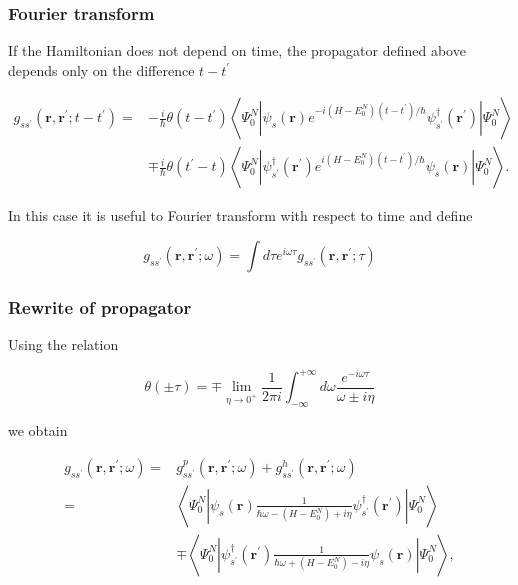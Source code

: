 \documentclass[compress]{beamer}
\begin{document}
\frame
{
\frametitle{Fourier transform}
\begin{small}
{\scriptsize

If the Hamiltonian does not depend on time, the propagator defined above
depends only on the difference $t-t^{\prime}$

$$
\begin{aligned}
g_{s s^{\prime}}\left(\mathbf{r}, \mathbf{r}^{\prime} ; t-t^{\prime}\right)= & -\frac{i}{\hbar} \theta\left(t-t^{\prime}\right)\left\langle\Psi_{0}^{N}\left|\psi_{s}(\mathbf{r}) e^{-i\left(H-E_{0}^{N}\right)\left(t-t^{\prime}\right) / \hbar} \psi_{s^{\prime}}^{\dagger}\left(\mathbf{r}^{\prime}\right)\right| \Psi_{0}^{N}\right\rangle \\
& \mp \frac{i}{\hbar} \theta\left(t^{\prime}-t\right)\left\langle\Psi_{0}^{N}\left|\psi_{s^{\prime}}^{\dagger}\left(\mathbf{r}^{\prime}\right) e^{i\left(H-E_{0}^{N}\right)\left(t-t^{\prime}\right) / \hbar} \psi_{s}(\mathbf{r})\right| \Psi_{0}^{N}\right\rangle .
\end{aligned}
$$

In this case it is useful to Fourier transform with respect to time and define

$$
g_{s s^{\prime}}\left(\mathbf{r}, \mathbf{r}^{\prime} ; \omega\right)=\int d \tau e^{i \omega \tau} g_{s s^{\prime}}\left(\mathbf{r}, \mathbf{r}^{\prime} ; \tau\right)
$$

}
\end{small}
}


\frame
{
\frametitle{Rewrite of propagator}
\begin{small}
{\scriptsize

Using the relation

$$
\theta( \pm \tau)=\mp \lim _{\eta \rightarrow 0^{+}} \frac{1}{2 \pi i} \int_{-\infty}^{+\infty} d \omega \frac{e^{-i \omega \tau}}{\omega \pm i \eta}
$$

we obtain

$$
\begin{aligned}
g_{s s^{\prime}}\left(\mathbf{r}, \mathbf{r}^{\prime} ; \omega\right)= & g_{s s^{\prime}}^{p}\left(\mathbf{r}, \mathbf{r}^{\prime} ; \omega\right)+g_{s s^{\prime}}^{h}\left(\mathbf{r}, \mathbf{r}^{\prime} ; \omega\right) \\
= & \left\langle\Psi_{0}^{N}\left|\psi_{s}(\mathbf{r}) \frac{1}{\hbar \omega-\left(H-E_{0}^{N}\right)+i \eta} \psi_{s^{\prime}}^{\dagger}\left(\mathbf{r}^{\prime}\right)\right| \Psi_{0}^{N}\right\rangle \\
& \mp\left\langle\Psi_{0}^{N}\left|\psi_{s^{\prime}}^{\dagger}\left(\mathbf{r}^{\prime}\right) \frac{1}{\hbar \omega+\left(H-E_{0}^{N}\right)-i \eta} \psi_{s}(\mathbf{r})\right| \Psi_{0}^{N}\right\rangle,
\end{aligned}
$$
}
\end{small}
}
\end{document}
